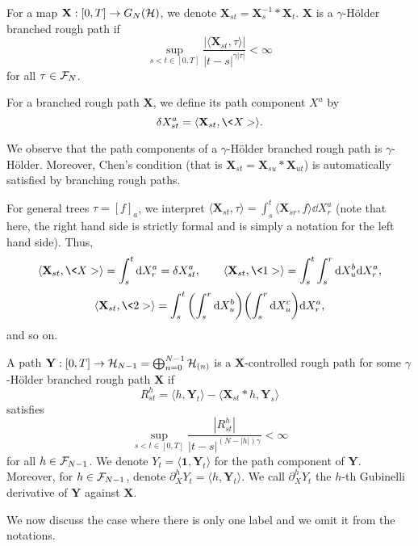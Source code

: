 \documentclass[11pt]{style/preprint}
\begin{document}
\begin{definition}
  For a map \(\mathbf{X} : [0, T] \to G_N({\mathcal H})\), we denote \(\mathbf{X}_{st} = \mathbf{X}^{-1}_s * \mathbf{X}_t\).
  \(\mathbf{X}\) is a \(\gamma\)-H\"older branched rough path if 
  \[\sup_{s < t \in [0, T]} \frac{|\langle \mathbf{X}_{st}, \tau\rangle|} {|t - s|^{\gamma|\tau|}} < \infty\]
  for all \(\tau \in {\mathcal F}_N\).

  For a branched rough path \(\mathbf{X}\), we define its path component \(X^a\) by 
  \[\delta X^a_{st} = \langle \mathbf{X}_{st}, \<X>\rangle.\]
\end{definition}

We observe that the path components of a \(\gamma\)-H\"older branched rough path is \(\gamma\)-H\"older. 
Moreover, Chen's condition (that is \(\mathbf{X}_{st} = \mathbf{X}_{su} * \mathbf{X}_{ut}\)) is automatically 
satisfied by branching rough paths. 

For general trees \(\tau = [f]_a\), we interpret \(\langle \mathbf{X}_{st}, \tau\rangle = 
  \int_s^t \langle \mathbf{X}_{sr}, f\rangle \dd X^a_r\) (note that here, the right hand side is strictly 
formal and is simply a notation for the left hand side). Thus, 
\[\langle \mathbf{X}_{st}, \<X> \rangle = \int_s^t \dd X^a_r = \delta X^a_{st}, \qquad
  \langle \mathbf{X}_{st}, \<1> \rangle = \int_s^t \int_s^r \dd X^b_u \dd X^a_r,\]
\[\langle \mathbf{X}_{st}, \<2>\rangle = \int_s^t \left(\int_s^r \dd X^b_u\right) \left(\int_s^r \dd X^c_u\right) \dd X^a_r,\] 
and so on.

\begin{definition}
  A path \(\mathbf{Y} : [0, T] \to {\mathcal H}_{N - 1} = \bigoplus_{n = 0}^{N - 1} {\mathcal H}_{(n)}\) is a 
  \(\mathbf{X}\)-controlled rough path for some \(\gamma\)-H\"older branched rough path \(\mathbf{X}\) if 
  \[R^h_{st} = \langle h, \mathbf{Y}_t\rangle - \langle \mathbf{X}_{st} * h, \mathbf{Y}_s\rangle\]
  satisfies 
  \[\sup_{s < t \in [0, T]} \frac{|R^h_{st}|}{|t - s|^{(N - |h|)\gamma}} < \infty\] 
  for all \(h \in {\mathcal F}_{N - 1}\). We denote \(Y_t = \langle \mathbf{1}, \mathbf{Y}_t\rangle\) for the 
  path component of \(\mathbf{Y}\). Moreover, for \(h \in {\mathcal F}_{N - 1}\), denote 
  \(\partial^h_X Y_t = \langle h, \mathbf{Y}_t\rangle\). We call \(\partial^h_X Y_t\) the \(h\)-th Gubinelli 
  derivative of \(\mathbf{Y}\) against \(\mathbf{X}\).
\end{definition}

We now discuss the case where there is only one label and we omit it from the notations.
\end{document}
